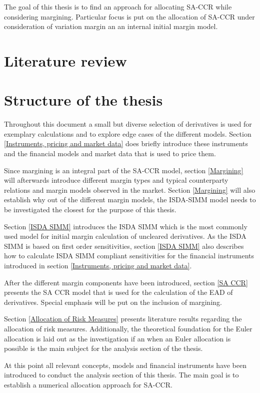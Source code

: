 \documentclass[../Thesis_AHoecherl.tex]{subfiles}
\begin{document}
    The goal of this thesis is to find an approach for allocating SA-CCR while considering margining. Particular focus is put on the allocation of SA-CCR under consideration of variation margin an an internal initial margin model. 
    
    \section{Literature review}
    \section{Structure of the thesis}

    Throughout this document a small but diverse selection of derivatives is used for exemplary calculations and to explore edge cases of the different models. Section \ref{Instruments, pricing and market data} does briefly introduce these instruments and the financial models and market data that is used to price them.
    
    Since margining is an integral part of the SA-CCR model, section \ref{Margining} will afterwards introduce different margin types and typical counterparty relations and margin models observed in the market. Section \ref{Margining} will also establish why out of the different margin models, the ISDA-SIMM model needs to be investigated the closest for the purpose of this thesis.

    Section \ref{ISDA SIMM} introduces the ISDA SIMM which is the most commonly used model for initial margin calculation of uncleared derivatives. As the ISDA SIMM is based on first order sensitivities, section \ref{ISDA SIMM} also describes how to calculate \gls{ISDA SIMM} compliant sensitivities for the financial instruments introduced in section \ref{Instruments, pricing and market data}.

    After the different margin components have been introduced, section \ref{SA CCR} presents the SA CCR model that is used for the calculation of the \gls{EAD} of derivatives. Special emphasis will be put on the inclusion of margining.

    Section \ref{Allocation of Risk Measures} presents literature results regarding the allocation of risk measures. Additionally, the theoretical foundation for the Euler allocation is laid out as the investigation if an when an Euler allocation is possible is the main subject for the analysis section of the thesis.

    At this point all relevant concepts, models and financial instruments have been introduced to conduct the analysis section of this thesis. The main goal is to establish a numerical allocation approach for SA-CCR.
\end{document}
